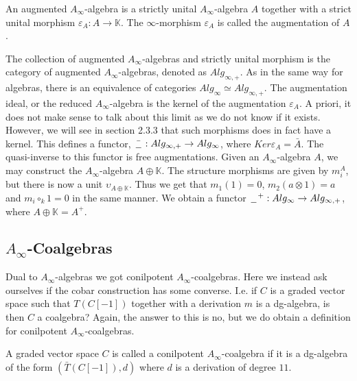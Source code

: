 \documentclass[../thesis.tex]{subfiles}
\begin{document}
        \begin{definition}\label{def: augmented-sha}
            An augmented $A_\infty$-algebra is a strictly unital $A_\infty$-algebra $A$ together with a strict unital morphism $\varepsilon_A : A \rightarrow \mathbb{K}$. The $\infty$-morphism $\varepsilon_A$ is called the augmentation of $A$.
        \end{definition}

        The collection of augmented $A_\infty$-algebras and strictly unital morphism is the category of augmented $A_\infty$-algebras, denoted as $Alg_{\infty,+}$. As in the same way for algebras, there is an equivalence of categories $Alg_\infty \simeq Alg_{\infty,+}$. The augmentation ideal, or the reduced $A_\infty$-algebra is the kernel of the augmentation $\varepsilon_A$. A priori, it does not make sense to talk about this limit as we do not know if it exists. However, we will see in section 2.3.3 that such morphisms does in fact have a kernel. This defines a functor, $\bar{\hspace{0.05cm}\underline{\hspace{0.2cm}}\hspace{0.05cm}} : Alg_{\infty ,+} \rightarrow Alg_\infty$, where $Ker\varepsilon_A = \bar{A}$. The quasi-inverse to this functor is free augmentations. Given an $A_\infty$-algebra $A$, we may construct the $A_\infty$-algebra $A\oplus \mathbb{K}$. The structure morphisms are given by $m_i^A$, but there is now a unit $\upsilon_{A\oplus\mathbb{K}}$. Thus we get that $m_1(1) = 0$, $m_2 (a\otimes 1) = a$ and $m_i \circ_k 1 = 0$ in the same manner. We obtain a functor $\hspace{0.05cm}\underline{\hspace{0.2cm}}\hspace{0.05cm}^+ : Alg_\infty \rightarrow Alg_{\infty, +}$, where $A\oplus \mathbb{K} = A^+$.

    \subsection{$A_\infty$-Coalgebras}    
        Dual to $A_\infty$-algebras we got conilpotent $A_\infty$-coalgebras. Here we instead ask ourselves if the cobar construction has some converse. I.e. if $C$ is a graded vector space such that $T(C[-1])$ together with a derivation $m$ is a dg-algebra, is then $C$ a coalgebra? Again, the answer to this is no, but we do obtain a definition for conilpotent $A_\infty$-coalgebras.

        \begin{definition}
            A graded vector space $C$ is called a conilpotent $A_\infty$-coalgebra if it is a dg-algebra of the form $(\bar{T}(C[-1]), d)$ where $d$ is a derivation of degree $11$.
        \end{definition}
\end{document}
